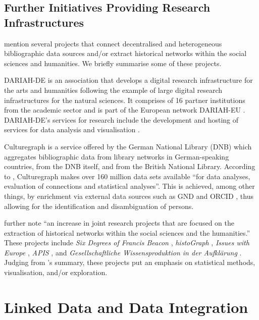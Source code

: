 \subsection{Further Initiatives Providing Research Infrastructures}

\textcite{Menzel2020} mention several projects that connect
decentralised and heterogeneous bibliographic data sources
and/or extract historical networks within the social sciences and humanities.
We briefly summarise some of these projects.

DARIAH-DE \autocite{DariahDE} is an association that develops
a digital research infrastructure for the arts and humanities
following the example of large digital research infrastructures for the natural sciences.
It comprises of 16 partner institutions from the academic sector
and is part of the European network DARIAH-EU \autocite{DariahEU}.
DARIAH-DE's services for research include
the development and hosting of services for data analysis and visualisation
\autocite{WikiDariahDE}.

Culturegraph \autocite{Vorndran2018,Culturegraph} is a service offered by the
German National Library (DNB) which aggregates bibliographic data 
from library networks in German-speaking countries,
from the DNB itself, and from the British National Library.
According to \textcite{Vorndran2018}, Culturegraph makes over 160 million data sets
available \enquote{for data analyses, evaluation of connections and statistical analyses}.
This is achieved, among other things,
by enrichment via external data sources such as GND \autocite{GND}
and ORCID \autocite{ORCID}, thus allowing for the identification
and disambiguation of persons.

\textcite{Menzel2020} further note \enquote{an increase in joint research projects
that are focused on the extraction of historical networks within the social sciences and the humanities.}
These projects include \emph{Six Degrees of Francis Beacon} \autocite{Warren2016,SixDegreesFB},
\emph{histoGraph} \autocite{Novak2014,histograph},
\emph{Issues with Europe} \autocite{IssuesWithEurope},
\emph{APIS} \autocite{Gruber2017,APIS},
and \emph{Gesellschaftliche Wissensproduktion in der Aufklärung} \autocite{Purschwitz2018}.
Judging from \citeauthor*{Menzel2020}'s \autocite*{Menzel2020} summary,
these projects put an emphasis on statistical methods,
visualisation, and/or exploration.


\section{Linked Data and Data Integration}
\label{sec:linked_data+integration}

